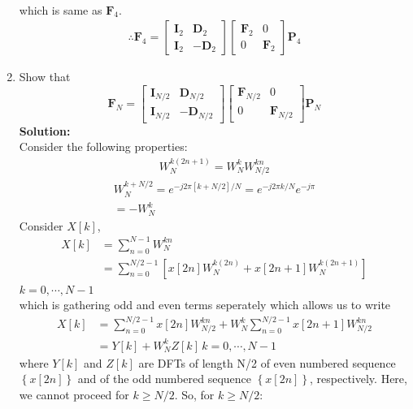 \documentclass[journal,12pt,twocolumn]{IEEEtran}
\newcommand{\solution}{\noindent \textbf{Solution: }}
\providecommand{\brak}[1]{\ensuremath{\left(#1\right)}}
\providecommand{\cbrak}[1]{\ensuremath{\left\{#1\right\}}}
\providecommand{\sbrak}[1]{\ensuremath{\left[#1\right]}}
\let\vec\mathbf
\numberwithin{equation}{section}
\renewcommand\thesection{\arabic{section}}
\begin{document}
\begin{enumerate}[label=\arabic*.,ref=\thesection.\theenumi]
\begin{align}
\end{align}
which is same as $\vec{F}_4$.
\begin{align}
\therefore \vec{F}_{4}=
\begin{bmatrix}
	\vec{I}_{2} & \vec{D}_{2} \\
\vec{I}_{2} & -\vec{D}_{2}
\end{bmatrix}
\begin{bmatrix}
\vec{F}_{2} & 0 \\
0 & \vec{F}_{2}
\end{bmatrix}
\vec{P}_{4}
\end{align}
\item Show that 
\begin{equation}
\vec{F}_{N}=
\begin{bmatrix}
\vec{I}_{N/2} & \vec{D}_{N/2} \\
\vec{I}_{N/2} & -\vec{D}_{N/2}
\end{bmatrix}
\begin{bmatrix}
\vec{F}_{N/2} & 0 \\
0 & \vec{F}_{N/2}
\end{bmatrix}
\vec{P}_{N}
\end{equation}
\solution \\
Consider the following properties:
\begin{align}
W_N^{k\brak{2n+1}}=W_N^{k}W_{N/2}^{kn}
\end{align}
\begin{align}
\label{eq:periodicity}
W_N^{k+N/2}=e^{- j 2 \pi \sbrak{k+N/2} / N }=e^{- j 2 \pi k / N }e^{- j \pi}\\
=-W_N^{k}
\end{align}
Consider $X\sbrak{k}$,
\begin{align}
X\sbrak{k}&=\sum_{n=0}^{N-1}W_N^{kn}\\
&=\sum_{n=0}^{N/2-1}\sbrak{x\sbrak{2n}W_N^{k\brak{2n}}+x\sbrak{2n+1}W_N^{k\brak{2n+1}}}
\end{align}
$k=0,\cdots,N-1$\\
which is gathering odd and even terms seperately
which allows us to write
\begin{align}
X\sbrak{k}&=\sum_{n=0}^{N/2-1}x\sbrak{2n}W_{N/2}^{kn}+W_N^k\sum_{n=0}^{N/2-1}x\sbrak{2n+1}W_{N/2}^{kn}\\
\label{eq:mat1}
&=Y\sbrak{k}+W_N^k Z\sbrak{k} \,k=0,\cdots,N-1
\end{align}
 where $Y\sbrak{k}$ and $Z\sbrak{k}$ are DFTs of length N/2 of even numbered sequence $\cbrak{x\sbrak{2n}}$ and of the odd numbered sequence $\cbrak{x\sbrak{2n}}$, respectively. Here, we cannot proceed for $k\ge N/2$. So, for $k \ge N/2:$

\end{enumerate}
\end{document}

